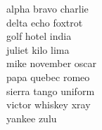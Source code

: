 alpha bravo charlie \\
delta echo foxtrot \\
golf hotel india \\
juliet kilo lima \\
mike november oscar \\
papa quebec romeo \\
sierra tango uniform \\
victor whiskey xray \\
yankee zulu \\
